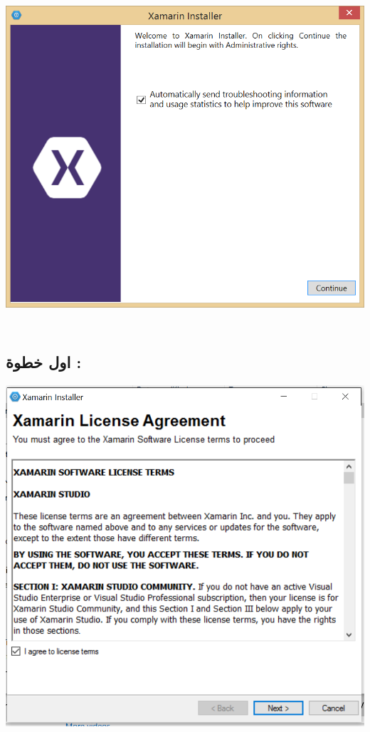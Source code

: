  \begin{otherlanguage}{english}
 	
 	
 	\includegraphics[height=5in,width=6in]{downloadstart.png}
 	
 	
 \end{otherlanguage}
 
 
\subsection{اول خطوة : }


   \begin{otherlanguage}{english}
   	
   	
   	\includegraphics[height=5in,width=6in]{installer2.png}
   	
   	
   \end{otherlanguage}
